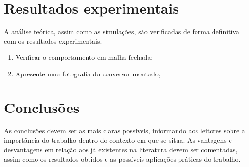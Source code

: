 \section{Resultados experimentais}


A análise teórica, assim como as simulações, são verificadas de forma definitiva com os resultados experimentais.
\begin{enumerate}									
	\item Verificar o comportamento em malha fechada;
	\item  Apresente uma fotografia do conversor montado;
\end{enumerate}

\section{Conclusões} 


As conclusões devem ser as mais claras possíveis, informando aos leitores sobre a importância do trabalho dentro do contexto em que se situa. As vantagens e desvantagens em relação aos já existentes na literatura devem ser comentadas, assim como os resultados obtidos e as possíveis aplicações práticas do trabalho.





\balance


